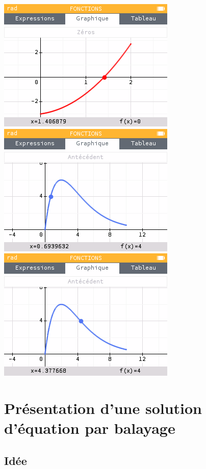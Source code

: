 \documentclass[a4paper,french,11pt]{article}
\begin{document}
\begin{PresCodePL}{}
\hfill\includegraphics[scale=0.45]{./graphics/pl-solve_b}~~
\includegraphics[scale=0.45]{./graphics/pl-solve_c}~~
\includegraphics[scale=0.45]{./graphics/pl-solve_d}\hfill~
\end{PresCodePL}

\newpage

\section{Présentation d'une solution d'équation par balayage}\label{solutiontvi}

\subsection{Idée}
\end{document}
